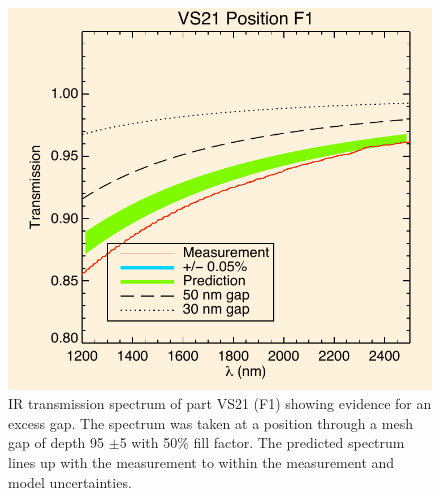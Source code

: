 \documentclass[osajnl,preprint,showpacs,superscriptaddress,12pt]{revtex4-1} %
\begin{document}
\begin{figure}[htbp]
\centerline{\includegraphics[width=.8\columnwidth]{figs/20130911_VS21posF1}}
\caption{IR transmission spectrum of part VS21 (F1) showing evidence for an excess gap\label{VS21specf1}.  The spectrum was taken at a position through a mesh gap of depth 95 $\pm$5 with 50\% fill factor.  The predicted spectrum lines up with the measurement to within the measurement and model uncertainties.}
\end{figure}
\end{document}
